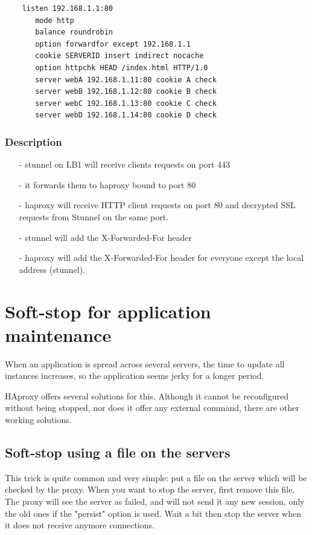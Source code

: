 \begin{verbatim}
    listen 192.168.1.1:80
       mode http
       balance roundrobin
       option forwardfor except 192.168.1.1
       cookie SERVERID insert indirect nocache
       option httpchk HEAD /index.html HTTP/1.0
       server webA 192.168.1.11:80 cookie A check
       server webB 192.168.1.12:80 cookie B check
       server webC 192.168.1.13:80 cookie C check
       server webD 192.168.1.14:80 cookie D check
\end{verbatim}

\subsubsection{Description}

\begin{itemize}
\item[-] stunnel on LB1 will receive clients requests on port 443
\item[-] it forwards them to haproxy bound to port 80
\item[-] haproxy will receive HTTP client requests on port 80 and decrypted SSL
   requests from Stunnel on the same port.
\item[-] stunnel will add the X-Forwarded-For header
\item[-] haproxy will add the X-Forwarded-For header for everyone except the local
   address (stunnel).
\end{itemize}

\section{Soft-stop for application maintenance}
\label{sec:soft_stop_for_application_maintenance}

When an application is spread across several servers, the time to update all
instances increases, so the application seems jerky for a longer period.

HAproxy offers several solutions for this. Although it cannot be reconfigured
without being stopped, nor does it offer any external command, there are other
working solutions.

\subsection{Soft-stop using a file on the servers}

This trick is quite common and very simple: put a file on the server which will
be checked by the proxy. When you want to stop the server, first remove this
file. The proxy will see the server as failed, and will not send it any new
session, only the old ones if the "persist" option is used. Wait a bit then
stop the server when it does not receive anymore connections.

